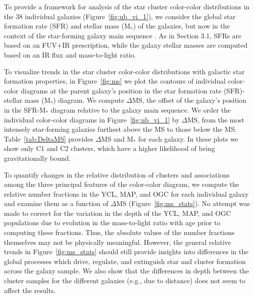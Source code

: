 \documentclass[linenumbers]{aastex63}
\begin{document}
To provide a framework for analysis of the star cluster color-color distributions in the 38 individual galaxies (Figure~\ref{fig:ub_vi_1}), we consider the global star formation rate (SFR) and stellar mass (M$_*$) of the galaxies, but now in the context of the star-forming galaxy main sequence \citep[e.g.,][]{salim_uv_2007, noeske_star_2007, lee_star_2007,peng_mass_2010}.  As in Section 3.1, SFRs are based on an FUV$+$IR prescription, while the galaxy stellar masses are computed based on an IR flux and mass-to-light ratio.

To visualize trends in the star cluster color-color distributions with galactic star formation properties, in  Figure~\ref{fig:ms} we plot the contours of individual color-color diagrams at the parent galaxy’s position in the star formation rate (SFR)-stellar mass (M$_*$) diagram.  We compute $\Delta$MS, the offset of the galaxy's position in the SFR-M$_*$ diagram relative to the galaxy main sequence.   We order the individual color-color diagrams in Figure~\ref{fig:ub_vi_1} by $\Delta$MS, from the most intensely star-forming galaxies furthest above the MS to those below the MS.  Table~\ref{tab:DeltaMS} provides $\Delta$MS and M$_*$ for each galaxy.  In these plots we show only C1 and C2 clusters, which have a higher likelihood of being gravitationally bound.  

To quantify changes in the relative distribution of clusters and associations among the three principal features of the color-color diagram, we compute the relative number fractions in the YCL, MAP, and OGC for each individual galaxy and examine them as a function of $\Delta$MS (Figure~\ref{fig:ms_stats}). No attempt was made to correct for the variation in the depth of the YCL, MAP, and OGC populations due to evolution in the mass-to-light ratio with age prior to computing these fractions.  Thus, the absolute values of the number fractions themselves may not be physically meaningful.  However, the general 
relative trends in Figure~\ref{fig:ms_stats} should still provide insights into differences in the global processes which drive, regulate, and extinguish star and cluster formation across the galaxy sample.  We also show that the differences in depth between the cluster samples for the different galaxies (e.g., due to distance) does not seem to affect the results.
 
\end{document}
